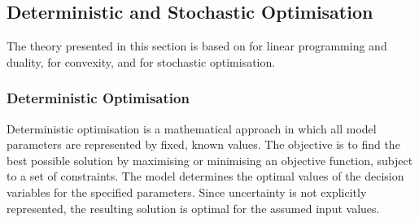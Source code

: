
\subsection{Deterministic and Stochastic Optimisation}
\label{subsec:theory_det_stoch}

The theory presented in this section is based on \textcite{lundgren2010} for linear programming and duality, \textcite{boydVandenberghe2004} for convexity, and \textcite{birgeLouveaux2011} for stochastic optimisation.

\subsubsection{Deterministic Optimisation}
\label{subsec:deterministic_optimisation}

Deterministic optimisation is a mathematical approach in which all model parameters are represented by fixed, known values. The objective is to find the best possible solution by maximising or minimising an objective function, subject to a set of constraints. The model determines the optimal values of the decision variables for the specified parameters. Since uncertainty is not explicitly represented, the resulting solution is optimal for the assumed input values.

